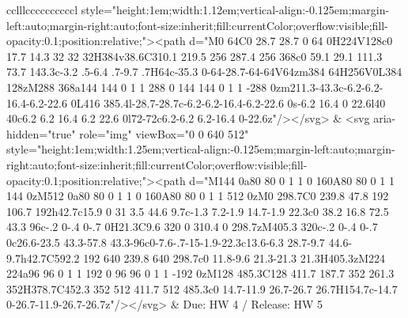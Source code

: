 \documentclass[
]{article}
\begin{document}
\begin{figure*}
\begin{longtable*}{cclllccccccccccl}
style="height:1em;width:1.12em;vertical-align:-0.125em;margin-left:auto;margin-right:auto;font-size:inherit;fill:currentColor;overflow:visible;fill-opacity:0.1;position:relative;"><path d="M0 64C0 28.7 28.7 0 64 0H224V128c0 17.7 14.3 32 32 32H384v38.6C310.1 219.5 256 287.4 256 368c0 59.1 29.1 111.3 73.7 143.3c-3.2 .5-6.4 .7-9.7 .7H64c-35.3 0-64-28.7-64-64V64zm384 64H256V0L384 128zM288 368a144 144 0 1 1 288 0 144 144 0 1 1 -288 0zm211.3-43.3c-6.2-6.2-16.4-6.2-22.6 0L416 385.4l-28.7-28.7c-6.2-6.2-16.4-6.2-22.6 0s-6.2 16.4 0 22.6l40 40c6.2 6.2 16.4 6.2 22.6 0l72-72c6.2-6.2 6.2-16.4 0-22.6z"/></svg> & <svg aria-hidden="true" role="img" viewBox="0 0 640 512" style="height:1em;width:1.25em;vertical-align:-0.125em;margin-left:auto;margin-right:auto;font-size:inherit;fill:currentColor;overflow:visible;fill-opacity:0.1;position:relative;"><path d="M144 0a80 80 0 1 1 0 160A80 80 0 1 1 144 0zM512 0a80 80 0 1 1 0 160A80 80 0 1 1 512 0zM0 298.7C0 239.8 47.8 192 106.7 192h42.7c15.9 0 31 3.5 44.6 9.7c-1.3 7.2-1.9 14.7-1.9 22.3c0 38.2 16.8 72.5 43.3 96c-.2 0-.4 0-.7 0H21.3C9.6 320 0 310.4 0 298.7zM405.3 320c-.2 0-.4 0-.7 0c26.6-23.5 43.3-57.8 43.3-96c0-7.6-.7-15-1.9-22.3c13.6-6.3 28.7-9.7 44.6-9.7h42.7C592.2 192 640 239.8 640 298.7c0 11.8-9.6 21.3-21.3 21.3H405.3zM224 224a96 96 0 1 1 192 0 96 96 0 1 1 -192 0zM128 485.3C128 411.7 187.7 352 261.3 352H378.7C452.3 352 512 411.7 512 485.3c0 14.7-11.9 26.7-26.7 26.7H154.7c-14.7 0-26.7-11.9-26.7-26.7z"/></svg> & Due: HW 4 / Release: HW 5 \\ 

\end{longtable*}
\end{figure*}
\end{document}
